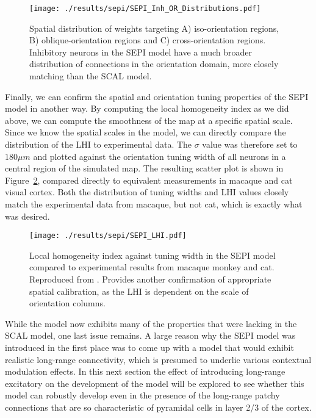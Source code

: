 \begin{figure}
	\centering
        \texttt{[image: ./results/sepi/SEPI\_Inh\_OR\_Distributions.pdf]}
	\caption{Spatial distribution of weights targeting A)
      iso-orientation regions, B) oblique-orientation regions and C)
      cross-orientation regions. Inhibitory neurons in the SEPI model
      have a much broader distribution of connections in the
      orientation domain, more closely matching \cite{Kisvarday1997a}
      than the SCAL model.}
	\label{SEPI_OR_Distributions}
\end{figure}

Finally, we can confirm the spatial and orientation tuning properties
of the SEPI model in another way. By computing the local homogeneity
index as we did above, we can compute the smoothness of the map at a
specific spatial scale. Since we know the spatial scales in the model,
we can directly compare the distribution of the LHI to experimental
data. The $\sigma$ value was therefore set to $180 \mu m$ and plotted
against the orientation tuning width of all neurons in a central
region of the simulated map. The resulting scatter plot is shown in
Figure~\ref{SEPILHI}, compared directly to equivalent measurements in
macaque and cat visual cortex. Both the distribution of tuning widths
and LHI values closely match the experimental data from macaque, but
not cat, which is exactly what was desired.

\begin{figure}
	\centering
        \texttt{[image: ./results/sepi/SEPI\_LHI.pdf]}
	\caption{Local homogeneity index against tuning width in the SEPI
      model compared to experimental results from macaque monkey and
      cat. Reproduced from \cite{Nauhaus2008}. Provides another
      confirmation of appropriate spatial calibration, as the LHI is
      dependent on the scale of orientation columns.}
	\label{SEPILHI}
\end{figure}

While the model now exhibits many of the properties that were lacking
in the SCAL model, one last issue remains. A large reason why the SEPI
model was introduced in the first place was to come up with a model
that would exhibit realistic long-range connectivity, which is
presumed to underlie various contextual modulation effects. In this
next section the effect of introducing long-range excitatory on the
development of the model will be explored to see whether this model
can robustly develop even in the presence of the long-range patchy
connections that are so characteristic of pyramidal cells in layer 2/3
of the cortex.

